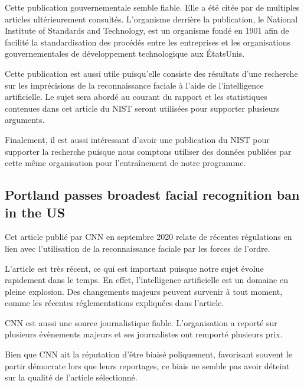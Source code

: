 \documentclass[letterpaper,10pt,french]{sphinxmanual}
\begin{document}
Cette publication gouvernementale semble fiable. Elle a été citée par de
multiples articles ultérieurement consultés. L’organisme derrière la
publication, le National Institute of Standards and Technology, est un organisme
fondé en 1901 afin de facilité la standardisation des procédés entre les
entreprises et les organisations gouvernementales de développement technologique
aux États\sphinxhyphen{}Unis.

Cette publication est aussi utile puisqu’elle consiste des résultats d’une
recherche sur les imprécisions de la reconnaissance faciale à l’aide de
l’intelligence artificielle. Le sujet sera abordé au courant du rapport et
les statistiques contenues dans cet article du NIST seront utilisées pour
supporter plusieurs arguments.

Finalement, il est aussi intéressant d’avoir une publication du NIST pour
supporter la recherche puisque nous comptons utiliser des données publiées
par cette même organisation pour l’entraînement de notre programme.


\subsection{Portland passes broadest facial recognition ban in the US}
\label{\detokenize{biblio_commented:portland-passes-broadest-facial-recognition-ban-in-the-us}}

Cet article publié par CNN en septembre 2020 relate de récentes régulations
en lien avec l’utilisation de la reconnaissance faciale par les forces de
l’ordre.

L’article est très récent, ce qui est important puisque notre
sujet évolue rapidement dans le temps. En effet, l’intelligence artificielle
est un domaine en pleine explosion. Des changements majeurs peuvent survenir
à tout moment, comme les récentes réglementations expliquées dans l’article.

CNN est aussi une source journalistique fiable. L’organisation a reporté sur
plusieurs évènements majeurs et ses journalistes ont remporté plusieurs prix.

Bien que CNN ait la réputation d’être biaisé poliquement, favorisant
souvent le partir démocrate lors que leurs reportages, ce biais ne semble pas
avoir déteint sur la qualité de l’article sélectionné.
\end{document}
